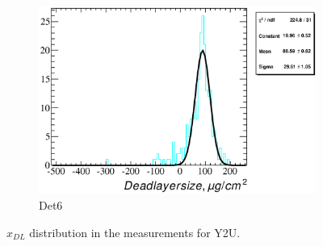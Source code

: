 \documentclass[a4paper,12pt]{article}
\begin{document}
\begin{figure}
\begin{subfigure}[b]{0.325\textwidth}
\includegraphics[width=\textwidth]{gfx/run13_alpha_study/Y2U/c_hDeadLayerSize_by_run_distribution6_Y2U.eps}
\caption{Det6}
\end{subfigure}
\caption{$x_{DL}$ distribution in the measurements for Y2U.}
\end{figure}
\end{document}
